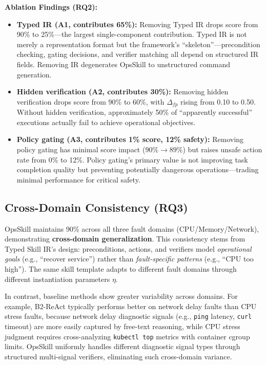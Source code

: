 \documentclass[conference,10pt]{IEEEtran}
\begin{document}
\noindent\textbf{Ablation Findings (RQ2):}
\begin{itemize}
  \item \textbf{Typed IR (A1, contributes 65\%):} Removing Typed IR drops score from 90\% to 25\%---the largest single-component contribution.
  Typed IR is not merely a representation format but the framework's ``skeleton''---precondition checking, gating decisions, and verifier matching all depend on structured IR fields.
  Removing IR degenerates OpsSkill to unstructured command generation.
  \item \textbf{Hidden verification (A2, contributes 30\%):} Removing hidden verification drops score from 90\% to 60\%, with $\Delta_{fp}$ rising from 0.10 to 0.50.
  Without hidden verification, approximately 50\% of ``apparently successful'' executions actually fail to achieve operational objectives.
  \item \textbf{Policy gating (A3, contributes 1\% score, 12\% safety):} Removing policy gating has minimal score impact ($90\%\to89\%$) but raises unsafe action rate from 0\% to 12\%.
  Policy gating's primary value is not improving task completion quality but preventing potentially dangerous operations---trading minimal performance for critical safety.
\end{itemize}

\subsection{Cross-Domain Consistency (RQ3)}



OpsSkill maintains 90\% across all three fault domains (CPU/Memory/Network), demonstrating \textbf{cross-domain generalization}.
This consistency stems from Typed Skill IR's design: preconditions, actions, and verifiers model \emph{operational goals} (e.g., ``recover service'') rather than \emph{fault-specific patterns} (e.g., ``CPU too high'').
The same skill template adapts to different fault domains through different instantiation parameters $\eta$.

In contrast, baseline methods show greater variability across domains.
For example, B2-ReAct typically performs better on network delay faults than CPU stress faults, because network delay diagnostic signals (e.g., \texttt{ping} latency, \texttt{curl} timeout) are more easily captured by free-text reasoning, while CPU stress judgment requires cross-analyzing \texttt{kubectl top} metrics with container cgroup limits.
OpsSkill uniformly handles different diagnostic signal types through structured multi-signal verifiers, eliminating such cross-domain variance.
\end{document}
